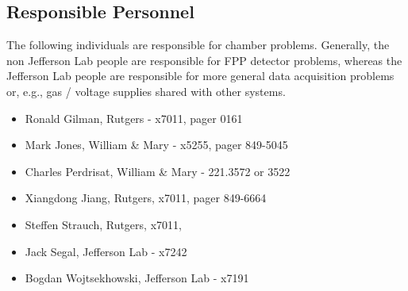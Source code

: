 \subsection{Responsible Personnel} 
The following individuals are responsible for chamber problems. 
Generally, the non Jefferson Lab people are responsible for
FPP detector problems, whereas the Jefferson Lab people are responsible
for more general data acquisition problems or, e.g., gas / voltage supplies
shared with other systems.
\begin{itemize} 
\item[~]Ronald Gilman, Rutgers - x7011, pager 0161
\item[~]Mark Jones, William \& Mary - x5255, pager 849-5045
\item[~]Charles Perdrisat, William \& Mary  - 221.3572 or 3522
\item[~]Xiangdong Jiang, Rutgers, x7011, pager 849-6664 
\item[~]Steffen Strauch, Rutgers, x7011, 
\item[~]Jack Segal, Jefferson Lab - x7242 
\item[~]Bogdan Wojtsekhowski, Jefferson Lab - x7191 
\end{itemize} 
 
\vfill\eject
%
